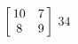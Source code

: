 {$\left[\hskip -3pt \begin{array}{cc} 10&7\\  8&9\end {array} \hskip -3pt
 \right]$} 
{$34$}



  

